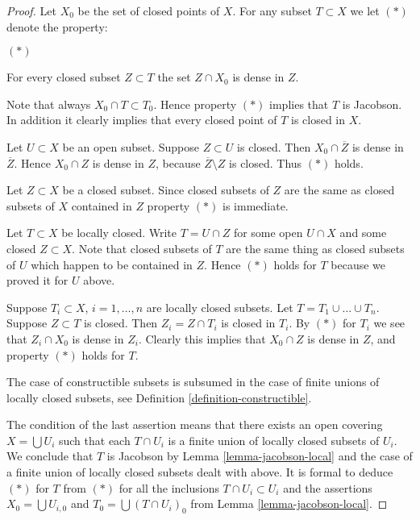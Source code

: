\begin{proof}
Let $X_0$ be the set of closed points of $X$. For any subset
$T \subset X$ we let $(*)$ denote the property:
\begin{list}{$(*)$}{}
\item For every closed subset $Z \subset T$ the set $Z\cap X_0$
is dense in $Z$.
\end{list}
Note that always $X_0 \cap T \subset T_0$. Hence property $(*)$
implies that $T$ is Jacobson. In addition it clearly implies
that every closed point of $T$ is closed in $X$.

\medskip\noindent
Let $U \subset X$ be an open subset.
Suppose $Z \subset U$ is closed. Then $X_0 \cap \overline{Z}$ is
dense in $\overline{Z}$. Hence $X_0 \cap Z$ is dense in $Z$, because
$\overline{Z} \setminus Z$ is closed. Thus $(*)$ holds.

\medskip\noindent
Let $Z \subset X$ be a closed subset.
Since closed subsets of $Z$ are the same as closed subsets of
$X$ contained in $Z$ property $(*)$ is immediate.

\medskip\noindent
Let $T \subset X$ be locally closed. Write $T = U \cap Z$
for some open $U \cap X$ and some closed $Z \subset X$.
Note that closed subsets of $T$ are the same thing as
closed subsets of $U$ which happen to be contained in $Z$.
Hence $(*)$ holds for $T$ because we proved it for $U$ above.

\medskip\noindent
Suppose $T_i \subset X$, $i = 1, \ldots, n$ are locally closed subsets. Let
$T = T_1 \cup \ldots \cup T_n$. Suppose $Z \subset T$ is closed.
Then $Z_i = Z\cap T_i$ is closed in $T_i$. By $(*)$ for $T_i$ we see that
$Z_i \cap X_0$ is dense in $Z_i$. Clearly this implies that
$X_0 \cap Z$ is dense in $Z$, and property $(*)$ holds for
$T$.

\medskip\noindent
The case of constructible subsets is subsumed in the case
of finite unions of locally closed subsets, see Definition
\ref{definition-constructible}.

\medskip\noindent
The condition of the last assertion means that there exists
an open covering $X = \bigcup U_i$ such that each $T \cap U_i$
is a finite union of locally closed subsets of $U_i$. We conclude
that $T$ is Jacobson by Lemma \ref{lemma-jacobson-local} and the
case of a finite union of locally closed subsets dealt with above.
It is formal to deduce $(*)$ for $T$ from $(*)$ for all the inclusions
$T \cap U_i \subset U_i$ and the assertions $X_0 = \bigcup U_{i, 0}$
and $T_0 = \bigcup (T\cap U_i)_0$ from Lemma \ref{lemma-jacobson-local}.
\end{proof}

